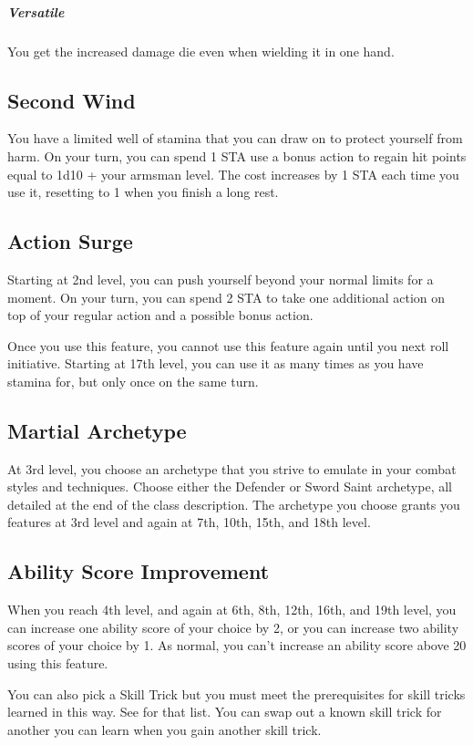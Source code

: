 \subparagraph*{Versatile} You get the increased damage die even when wielding it in one hand.

\subsection{Second Wind}

You have a limited well of stamina that you can draw on to protect yourself from harm. On your turn, you can spend 1 STA use a bonus action to regain hit points equal to 1d10 + your armsman level. The cost increases by 1 STA each time you use it, resetting to 1 when you finish a long rest.

\subsection{Action Surge}

Starting at 2nd level, you can push yourself beyond your normal limits for a moment. On your turn, you can spend 2 STA to take one additional action on top of your regular action and a possible bonus action.

Once you use this feature, you cannot use this feature again until you next roll initiative. Starting at 17th level, you can use it as many times as you have stamina for, but only once on the same turn.

\subsection{Martial Archetype}

At 3rd level, you choose an archetype that you strive to emulate in your combat styles and techniques. Choose either the Defender or Sword Saint archetype, all detailed at the end of the class description. The archetype you choose grants you features at 3rd level and again at 7th, 10th, 15th, and 18th level.

\subsection{Ability Score Improvement}

When you reach 4th level, and again at 6th, 8th, 12th, 16th, and 19th level, you can increase one ability score of your choice by 2, or you can increase two ability scores of your choice by 1. As normal, you can't increase an ability score above 20 using this feature.

You can also pick a Skill Trick but you must meet the prerequisites for skill tricks learned in this way. See  for that list. You can swap out a known skill trick for another you can learn when you gain another skill trick.


